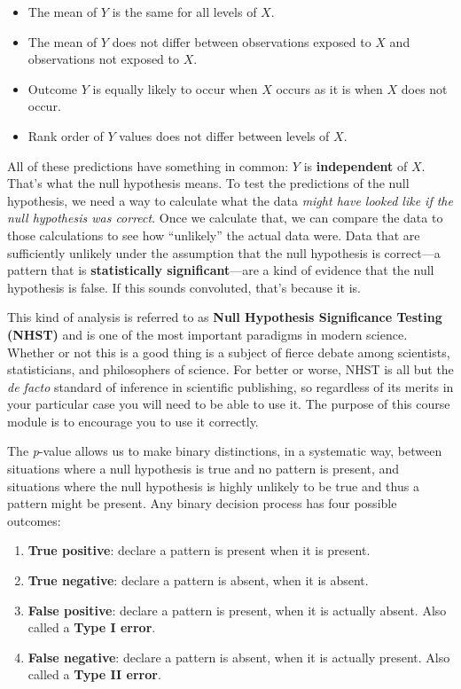 \documentclass[
  13,
  letterpaper,
]{report}
\providecommand{\tightlist}{%
  \setlength{\itemsep}{0pt}\setlength{\parskip}{0pt}}
\begin{document}
\begin{itemize}
\tightlist
\item
  The mean of \(Y\) is the same for all levels of \(X\).
\item
  The mean of \(Y\) does not differ between observations exposed to
  \(X\) and observations not exposed to \(X\).
\item
  Outcome \(Y\) is equally likely to occur when \(X\) occurs as it is
  when \(X\) does not occur.
\item
  Rank order of \(Y\) values does not differ between levels of \(X\).
\end{itemize}

All of these predictions have something in common: \(Y\) is
\textbf{independent} of \(X\). That's what the null hypothesis means. To
test the predictions of the null hypothesis, we need a way to calculate
what the data \emph{might have looked like if the null hypothesis was
correct}. Once we calculate that, we can compare the data to those
calculations to see how ``unlikely'' the actual data were. Data that are
sufficiently unlikely under the assumption that the null hypothesis is
correct---a pattern that is \textbf{statistically significant}---are a
kind of evidence that the null hypothesis is false. If this sounds
convoluted, that's because it is.

This kind of analysis is referred to as \textbf{Null Hypothesis
Significance Testing (NHST)} and is one of the most important paradigms
in modern science. Whether or not this is a good thing is a subject of
fierce debate among scientists, statisticians, and philosophers of
science. For better or worse, NHST is all but the \emph{de facto}
standard of inference in scientific publishing, so regardless of its
merits in your particular case you will need to be able to use it. The
purpose of this course module is to encourage you to use it correctly.

The \emph{p}-value allows us to make binary distinctions, in a
systematic way, between situations where a null hypothesis is true and
no pattern is present, and situations where the null hypothesis is
highly unlikely to be true and thus a pattern might be present. Any
binary decision process has four possible outcomes:

\begin{enumerate}
\def\labelenumi{\arabic{enumi}.}
\tightlist
\item
  \textbf{True positive}: declare a pattern is present when it is
  present.
\item
  \textbf{True negative}: declare a pattern is absent, when it is
  absent.
\item
  \textbf{False positive}: declare a pattern is present, when it is
  actually absent. Also called a \textbf{Type I error}.
\item
  \textbf{False negative}: declare a pattern is absent, when it is
  actually present. Also called a \textbf{Type II error}.
\end{enumerate}
\end{document}
